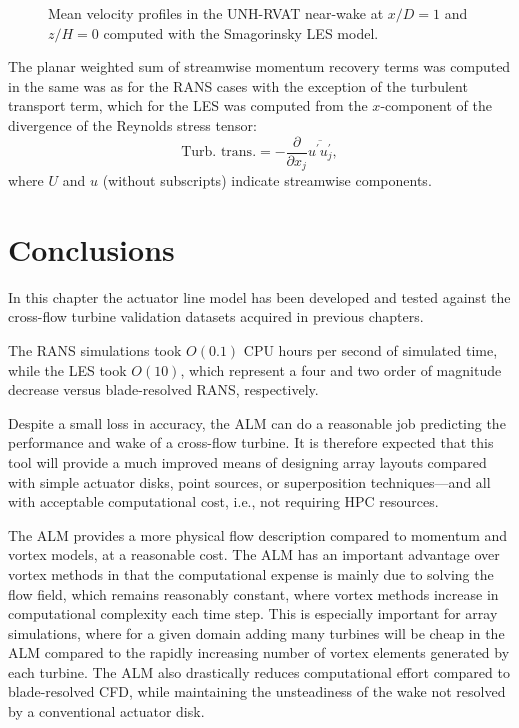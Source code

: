 \begin{figure}
    \centering
    
    \caption{Mean velocity profiles in the UNH-RVAT near-wake at $x/D=1$ and
        $z/H=0$ computed with the Smagorinsky LES model.}
    
    \label{fig:RVAT-ALM-LES-profiles}
\end{figure}

The planar weighted sum of streamwise momentum recovery terms was computed in
the same was as for the RANS cases with the exception of the turbulent transport
term, which for the LES was computed from the $x$-component of the divergence of
the Reynolds stress tensor:
\begin{equation}
    \text{Turb. trans.} = -\frac{\partial}{\partial x_j}
    \overline{u^\prime u^\prime_j},
\end{equation}
where $U$ and $u$ (without subscripts) indicate streamwise components.



\section{Conclusions}

In this chapter the actuator line model has been developed and tested against
the cross-flow turbine validation datasets acquired in previous chapters.

The RANS simulations took $O(0.1)$ CPU hours per second of simulated time, while
the LES took $O(10)$, which represent a four and two order of magnitude decrease
versus blade-resolved RANS, respectively.

Despite a small loss in accuracy, the ALM can do a reasonable job predicting the
performance and wake of a cross-flow turbine. It is therefore expected that this
tool will provide a much improved means of designing array layouts compared with
simple actuator disks, point sources, or superposition techniques---and all with
acceptable computational cost, i.e., not requiring HPC resources.

The ALM provides a more physical flow description compared to momentum and
vortex models, at a reasonable cost. The ALM has an important advantage over
vortex methods in that the computational expense is mainly due to solving the
flow field, which remains reasonably constant, where vortex methods increase in
computational complexity each time step. This is especially important for array
simulations, where for a given domain adding many turbines will be cheap in the
ALM compared to the rapidly increasing number of vortex elements generated by
each turbine. The ALM also drastically reduces computational effort compared to
blade-resolved CFD, while maintaining the unsteadiness of the wake not resolved
by a conventional actuator disk.

